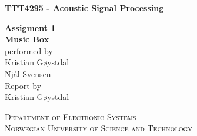 \documentclass[english]{report}
\begin{document}
\pagestyle{empty} %
\newcommand{\HRule}{\rule{\linewidth}{1mm}}
\begin{center}
\end{center}

\begin{center}
\textbf {TTT4295 - Acoustic Signal Processing}
\end{center}


\begin{center}
  \large
  \textbf{Assigment 1}\\
  \huge
  \textbf{Music Box\\}
  \small
  \noindent performed by \\
  \large
  \noindent Kristian Gøystdal\\Njål Svensen\\ 
  \small
  \noindent Report by \\
  \large
  \noindent Kristian Gøystdal\\
\end{center}

\begin{center}
\textsc{Department of Electronic Systems}\\
\textsc{Norwegian University of Science and Technology}
\end{center}

\cleardoublepage
{} 


\cleardoublepage
{}
\pagestyle{plain}



\tableofcontents
\cleardoublepage
{}










\appendix

% 
\end{document}
